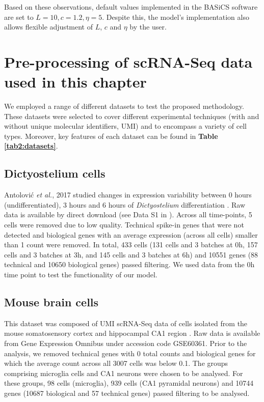 Based on these observations, default values implemented in the BASiCS software are set to $L=10, c=1.2, \eta=5$. Despite this, the model's implementation also allows flexible adjustment of $L$, $c$ and $\eta$ by the user. 

\newpage

\section{Pre-processing of scRNA-Seq data used in this chapter} \label{sec2:datasets}

We employed a range of different datasets to test the proposed methodology. These datasets were selected to cover different experimental techniques (with and without unique molecular identifiers, UMI) and to encompass a variety of cell types. Moreover, key features of each dataset can be found in \textbf{Table \ref{tab2:datasets}}. 

\subsection{Dictyostelium cells} \label{seq::data_dict}

Antolovi\'{c} \emph{et al.}, 2017 studied changes in expression variability between 0 hours (undifferentiated), 3 hours and 6 hours of \emph{Dictyostelium} differentiation \cite{Antolovic2017}. Raw data is available by direct download (see Data S1 in \citep{Antolovic2017}). Across all time-points, 5 cells were removed due to low quality. Technical spike-in genes that were not detected and biological genes with an average expression (across all cells) smaller than 1 count were removed. In total, 433 cells (131 cells and 3 batches at 0h, 157 cells and 3 batches at 3h, and 145 cells and 3 batches at 6h) and 10551 genes (88 technical and 10650 biological genes) passed filtering. We used data from the 0h time point to test the functionality of our model.

\subsection{Mouse brain cells} \label{seq::data_micro}

This dataset was composed of UMI scRNA-Seq data of cells isolated from the mouse somatosensory cortex and hippocampal CA1 region \citep{Zeisel2015}. Raw data is available from Gene Expression Omnibus under accession code GSE60361. Prior to the analysis, we removed technical genes with 0 total counts and biological genes for which the average count across all 3007 cells was below 0.1. The groups comprising microglia cells and CA1 neurons were chosen to be analysed. For these groups, 98 cells (microglia), 939 cells (CA1 pyramidal neurons) and 10744 genes (10687 biological and 57 technical genes) passed filtering to be analysed.

